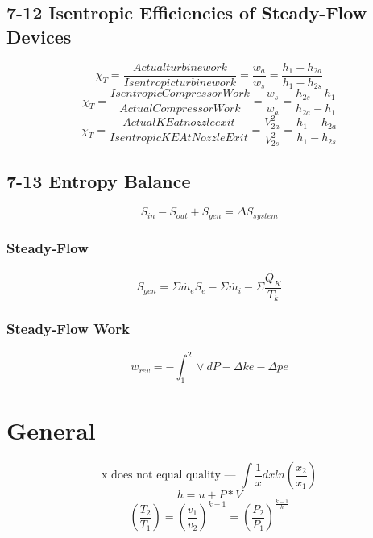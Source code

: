 \documentclass[10pt,landscape]{article}
\begin{document}
\begin{multicols}{3}
\subsection{7-12 Isentropic Efficiencies of Steady-Flow Devices}
\begin{equation}
    \chi_T=\frac{Actual turbine work}{Isentropic turbine work}=\frac{w_a}{w_s}=\frac{h_1-h_{2a}}{h_1-h_{2s}}
\end{equation}
\begin{equation}
    \chi_T=\frac{Isentropic Compressor Work}{Actual Compressor Work}=\frac{w_s}{w_a}=\frac{h_{2s}-h_1}{h_{2a}-h_1}
\end{equation}
\begin{equation}
    \chi_T=\frac{Actual KE at nozzle exit}{Isentropic KE At Nozzle Exit}=\frac{V^2_{2a}}{V^2_{2s}}=\frac{h_1-h_{2a}}{h_1-h_{2s}}
\end{equation}
\subsection{7-13 Entropy Balance}
\begin{equation}
    S_{in}-S_{out}+S_{gen}=\Delta S_{system}
\end{equation}
\subsubsection{Steady-Flow}
\begin{equation}
    S_{gen}=\Sigma \dot{m_e}S_e-\Sigma\dot{m_i}-\Sigma\frac{\dot{Q_K}}{T_k}
\end{equation}
\subsubsection{Steady-Flow Work}
\begin{equation}
    w_{rev}=-\int^2_1\vee dP-\Delta ke - \Delta pe
\end{equation}
\section{General}
\begin{equation}
    \text{x does not equal quality --- }\int\frac{1}{x}dxln(\frac{x_2}{x_1})
\end{equation}
\begin{equation}
    h=u+P*V
\end{equation}
\begin{equation}
    (\frac{T_2}{T_1})=(\frac{v_1}{v_2})^{k-1}=(\frac{P_2}{P_1})^{\frac{k-1}{k}}
\end{equation}


\end{multicols}
\end{document}
